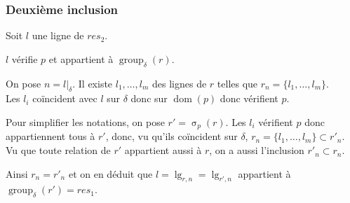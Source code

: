 \documentclass[french]{article}
\DeclareMathOperator{\sel}{\sigma}
\DeclareMathOperator{\group}{group}
\DeclareMathOperator{\dom}{dom}
\DeclareMathOperator{\lgr}{lg}
\newcommand{\selP}{\sel_p}
\newcommand{\groupDelta}{\group_{\delta}}
\begin{document}
\subsubsection*{Deuxième inclusion}
Soit $l$ une ligne de $res_2$.

$l$ vérifie $p$ et appartient à $\groupDelta(r)$.

On pose $n = l|_\delta$. Il existe $l_1, \dots, l_m$
des lignes de $r$ telles que $r_n = \{l_1, \dots, l_m\}$. \\

Les $l_i$ coïncident avec $l$ sur $\delta$ donc sur $\dom(p)$
donc vérifient $p$.

Pour simplifier les notations, on pose $r' = \selP(r)$.
Les $l_i$ vérifient $p$ donc appartiennent tous à $r'$,
donc, vu qu'ils coïncident sur $\delta$,
$r_n = \{l_1, \dots, l_m \} \subset r'_n$.
Vu que toute relation de $r'$ appartient aussi à $r$,
on a aussi l'inclusion $r'_n \subset r_n$.

Ainsi $r_n = r'_n$ et on en déduit que 
$l = \lgr_{r,n} = \lgr_{r', n}$ appartient
à $\groupDelta(r') = res_1$.
\end{document}
